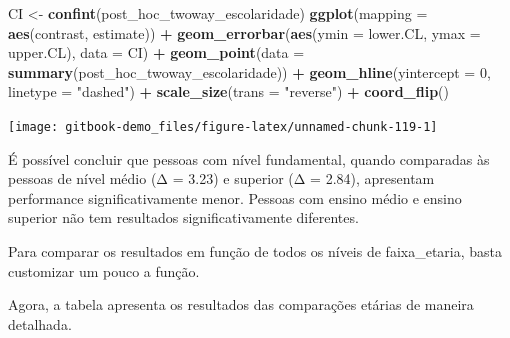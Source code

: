 \documentclass[
]{book}
\newenvironment{Shaded}{\begin{snugshade}}{\end{snugshade}}
\newcommand{\DataTypeTok}[1]{\textcolor[rgb]{0.13,0.29,0.53}{#1}}
\newcommand{\DecValTok}[1]{\textcolor[rgb]{0.00,0.00,0.81}{#1}}
\newcommand{\KeywordTok}[1]{\textcolor[rgb]{0.13,0.29,0.53}{\textbf{#1}}}
\newcommand{\NormalTok}[1]{#1}
\newcommand{\OperatorTok}[1]{\textcolor[rgb]{0.81,0.36,0.00}{\textbf{#1}}}
\newcommand{\StringTok}[1]{\textcolor[rgb]{0.31,0.60,0.02}{#1}}
\begin{document}
\begin{Shaded}
\begin{Highlighting}[]
\NormalTok{CI <-}\StringTok{ }\KeywordTok{confint}\NormalTok{(post_hoc_twoway_escolaridade)}
\KeywordTok{ggplot}\NormalTok{(}\DataTypeTok{mapping =} \KeywordTok{aes}\NormalTok{(contrast, estimate)) }\OperatorTok{+}
\StringTok{  }\KeywordTok{geom_errorbar}\NormalTok{(}\KeywordTok{aes}\NormalTok{(}\DataTypeTok{ymin =}\NormalTok{ lower.CL, }\DataTypeTok{ymax =}\NormalTok{ upper.CL), }\DataTypeTok{data =}\NormalTok{ CI) }\OperatorTok{+}
\StringTok{  }\KeywordTok{geom_point}\NormalTok{(}\DataTypeTok{data =} \KeywordTok{summary}\NormalTok{(post_hoc_twoway_escolaridade)) }\OperatorTok{+}
\StringTok{  }\KeywordTok{geom_hline}\NormalTok{(}\DataTypeTok{yintercept =} \DecValTok{0}\NormalTok{, }\DataTypeTok{linetype =} \StringTok{"dashed"}\NormalTok{) }\OperatorTok{+}\StringTok{ }
\StringTok{  }\KeywordTok{scale_size}\NormalTok{(}\DataTypeTok{trans =} \StringTok{"reverse"}\NormalTok{) }\OperatorTok{+}\StringTok{ }
\StringTok{  }\KeywordTok{coord_flip}\NormalTok{()}
\end{Highlighting}
\end{Shaded}

\begin{center}\texttt{[image: gitbook-demo\_files/figure-latex/unnamed-chunk-119-1]} \end{center}

É possível concluir que pessoas com nível fundamental, quando comparadas às pessoas de nível médio (Δ = 3.23) e superior (Δ = 2.84), apresentam performance significativamente menor. Pessoas com ensino médio e ensino superior não tem resultados significativamente diferentes.

Para comparar os resultados em função de todos os níveis de faixa\_etaria, basta customizar um pouco a função.

\begin{Shaded}
\end{Shaded}

Agora, a tabela apresenta os resultados das comparações etárias de maneira detalhada.
\end{document}
